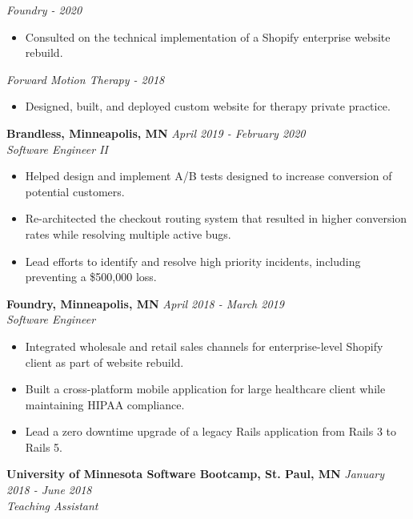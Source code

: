 \documentclass{res}
\begin{document}
\begin{resume}
			\emph{Foundry - 2020}

			\begin{itemize} \itemsep -2pt
				\item Consulted on the technical implementation of a Shopify enterprise website rebuild.
			\end{itemize}

			\emph{Forward Motion Therapy - 2018}

			\begin{itemize} \itemsep -2pt
				\item Designed, built, and deployed custom website for therapy private practice.
			\end{itemize}

		{\bf Brandless, Minneapolis, MN} \hfill \emph{April 2019 - February 2020} \\
			\emph{Software Engineer II}

			\begin{itemize} \itemsep -2pt
				\item Helped design and implement A/B tests designed to increase conversion of potential customers.
        \item Re-architected the checkout routing system that resulted in higher conversion rates while resolving multiple active bugs.
        \item Lead efforts to identify and resolve high priority incidents, including preventing a \$500,000 loss.
			\end{itemize}

		{\bf Foundry, Minneapolis, MN} \hfill \emph{April 2018 - March 2019} \\
			\emph{Software Engineer}

			\begin{itemize} \itemsep -2pt
				\item Integrated wholesale and retail sales channels for enterprise-level Shopify client as part of website rebuild.
				\item Built a cross-platform mobile application for large healthcare client while maintaining HIPAA compliance.
				\item Lead a zero downtime upgrade of a legacy Rails application from Rails 3 to Rails 5.
			\end{itemize}

		{\bf University of Minnesota Software Bootcamp, St. Paul, MN} \hfill \emph{January 2018 - June 2018} \\
			\emph{Teaching Assistant}


\end{resume}
\end{document}
